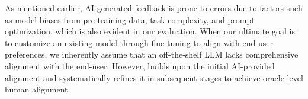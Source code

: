 As mentioned earlier, AI-generated feedback is prone to errors due to factors such as model biases from pre-training data, task complexity, and prompt optimization, which is also evident in our evaluation. When our ultimate goal is to customize an existing model through fine-tuning to align with end-user preferences, we inherently assume that an off-the-shelf LLM lacks comprehensive alignment with the end-user. However, \myname{} builds upon the initial AI-provided alignment and systematically refines it in subsequent stages to achieve oracle-level human alignment. 




